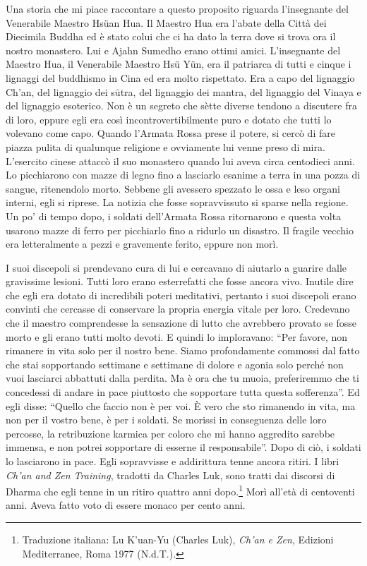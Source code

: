 Una storia che mi piace raccontare a questo proposito riguarda l'insegnante del Venerabile Maestro Hsüan Hua. Il Maestro Hua era l'abate della Città dei Diecimila Buddha ed è stato colui che ci ha dato la terra dove si trova ora il nostro monastero. Lui e Ajahn Sumedho erano ottimi amici. L'insegnante del Maestro Hua, il Venerabile Maestro Hsü Yün, era il patriarca di tutti e cinque i lignaggi del buddhismo in Cina ed era molto rispettato. Era a capo del lignaggio Ch'an, del lignaggio dei sūtra, del lignaggio dei mantra, del lignaggio del Vinaya e del lignaggio esoterico. Non è un segreto che sètte diverse tendono a discutere fra di loro, eppure egli era così incontrovertibilmente puro e dotato che tutti lo volevano come capo. Quando l'Armata Rossa prese il potere, si cercò di fare piazza pulita di qualunque religione e ovviamente lui venne preso di mira. L'esercito cinese attaccò il suo monastero quando lui aveva circa centodieci anni. Lo picchiarono con mazze di legno fino a lasciarlo esanime a terra in una pozza di sangue, ritenendolo morto. Sebbene gli avessero spezzato le ossa e leso organi interni, egli si riprese. La notizia che fosse sopravvissuto si sparse nella regione. Un po' di tempo dopo, i soldati dell'Armata Rossa ritornarono e questa volta usarono mazze di ferro per picchiarlo fino a ridurlo un disastro. Il fragile vecchio era letteralmente a pezzi e gravemente ferito, eppure non morì.

I suoi discepoli si prendevano cura di lui e cercavano di aiutarlo a guarire dalle gravissime lesioni. Tutti loro erano esterrefatti che fosse ancora vivo. Inutile dire che egli era dotato di incredibili poteri meditativi, pertanto i suoi discepoli erano convinti che cercasse di conservare la propria energia vitale per loro. Credevano che il maestro comprendesse la sensazione di lutto che avrebbero provato se fosse morto e gli erano tutti molto devoti. E quindi lo imploravano: ``Per favore, non rimanere in vita solo per il nostro bene. Siamo profondamente commossi dal fatto che stai sopportando settimane e settimane di dolore e agonia solo perché non vuoi lasciarci abbattuti dalla perdita. Ma è ora che tu muoia, preferiremmo che ti concedessi di andare in pace piuttosto che sopportare tutta questa sofferenza''. Ed egli disse: ``Quello che faccio non è per voi. È vero che sto rimanendo in vita, ma non per il vostro bene, è per i soldati. Se morissi in conseguenza delle loro percosse, la retribuzione karmica per coloro che mi hanno aggredito sarebbe immensa, e non potrei sopportare di esserne il responsabile''. Dopo di ciò, i soldati lo lasciarono in pace. Egli sopravvisse e addirittura tenne ancora ritiri. I libri \textit{Ch'an and Zen Training}, tradotti da Charles Luk, sono tratti dai discorsi di Dharma che egli tenne in un ritiro quattro anni dopo.\footnote{Traduzione italiana: Lu K'uan-Yu (Charles Luk), \textit{Ch'an e Zen}, Edizioni Mediterranee, Roma 1977 (N.d.T.).} Morì all'età di centoventi anni. Aveva fatto voto di essere monaco per cento anni.

